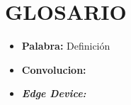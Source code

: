 %
\chapter{GLOSARIO}
\label{sec:glosario}

\begin{itemize}
    \item \textbf{Palabra:} Definición
    \item \textbf{Convolucion:}
    \item \textbf{\textit{Edge Device:}} 
\end{itemize}
